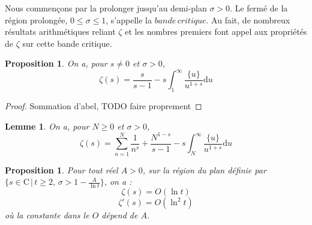 \documentclass[french]{report}
\newtheorem{proposition}[theorem]{Proposition}
\newtheorem{lemma}[theorem]{Lemme}
\begin{document}
Nous commençons par la prolonger jusqu'au demi-plan $\sigma>0$. Le fermé de la région prolongée, $0\leq\sigma\leq1$, s'appelle la $bande\,critique$. Au fait, de nombreux résultats arithmétiques reliant $\zeta$ et les nombres premiers font appel aux propriétés de $\zeta$ sur cette bande critique.

\begin{proposition} On a, pour $s\neq0$ et $\sigma>0$,
  \[ \zeta(s) = \frac{s}{s-1}-s\int_1^\infty\frac{\{u\}}{u^{1+s}}\mathrm{d}u \]
\end{proposition}

\begin{proof}
  Sommation d'abel, TODO faire proprement
\end{proof}


\begin{lemma}\label{lem:zeta-somme-partielle}
  On a, pour $N\geq0$ et $\sigma>0$,
  \[ \zeta(s) = \sum_{n=1}^N\frac{1}{n^s} + \frac{N^{1-s}}{s-1}-s\int_N^{\infty}\frac{\{u\}}{u^{1+s}}\mathrm{d}u \]
\end{lemma}

\begin{proposition}\label{prop:majoration-zeta-et-zeta-prime}
  Pour tout réel $A>0$, sur la région du plan définie par $\{s\in\mathrm{C}\,|\,t\geq2,\,\sigma>1-\frac{A}{\ln t}\}$, on a :
  \[ \zeta(s) = O(\ln t) \]
  \[ \zeta'(s) = O(\ln^2 t) \]
  où la constante dans le $O$ dépend de $A$.
\end{proposition}
\end{document}
